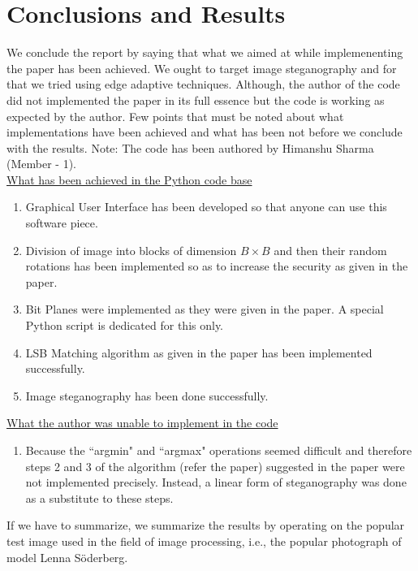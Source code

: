 \documentclass{report}
\begin{document}
\section{Conclusions and Results}
We conclude the report by saying that what we aimed at while implemenenting the paper has been achieved. We ought to target image steganography and for that we tried using edge adaptive techniques. Although, the author of the code did not implemented the paper in its full essence but the code is working as expected by the author. Few points that must be noted about what implementations have been achieved and what has been not before we conclude with the results. Note: The code has been authored by Himanshu Sharma (Member - 1). \\

\underline{\large What has been achieved in the Python code base}
\begin{enumerate}
\item Graphical User Interface has been developed so that anyone can use this software piece.
\item Division of image into blocks of dimension $B \times B$ and then their random rotations has been implemented so as to increase the security as given in the paper.
\item Bit Planes were implemented as they were given in the paper. A special Python script is dedicated for this only.
\item LSB Matching algorithm as given in the paper has been implemented successfully.
\item Image steganography has been done successfully.
\end{enumerate}
\par
\underline{\large What the author was unable to implement in the code}
\begin{enumerate}
\item Because the ``argmin" and ``argmax" operations seemed difficult and therefore steps 2 and 3 of the algorithm (refer the paper) suggested in the paper were not implemented precisely. Instead, a linear form of steganography was done as a substitute to these steps.
\end{enumerate}
If we have to summarize, we summarize the results by operating on the popular test image used in the field of image processing, i.e., the popular photograph of model Lenna S\"{o}derberg.
\end{document}
